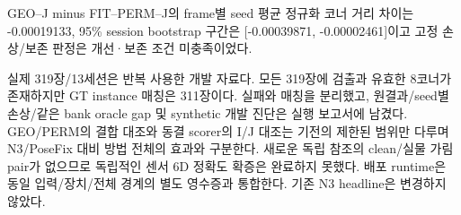 GEO--J minus FIT--PERM--J의 frame별 seed 평균 정규화 코너 거리 차이는 -0.00019133, 95\% session bootstrap 구간은 [-0.00039871, -0.00002461]이고 고정 손상/보존 판정은 개선·보존 조건 미충족이었다.

실제 319장/13세션은 반복 사용한 개발 자료다. 모든 319장에 검출과 유효한 8코너가 존재하지만 GT instance 매칭은 311장이다. 실패와 매칭을 분리했고, 원결과/seed별 손상/같은 bank oracle gap 및 synthetic 개발 진단은 실행 보고서에 남겼다. GEO/PERM의 결합 대조와 동결 scorer의 I/J 대조는 기전의 제한된 범위만 다루며 N3/PoseFix 대비 방법 전체의 효과와 구분한다. 새로운 독립 참조의 clean/실물 가림 pair가 없으므로 독립적인 센서 6D 정확도 확증은 완료하지 못했다. 배포 runtime은 동일 입력/장치/전체 경계의 별도 영수증과 통합한다. 기존 N3 headline은 변경하지 않았다.
